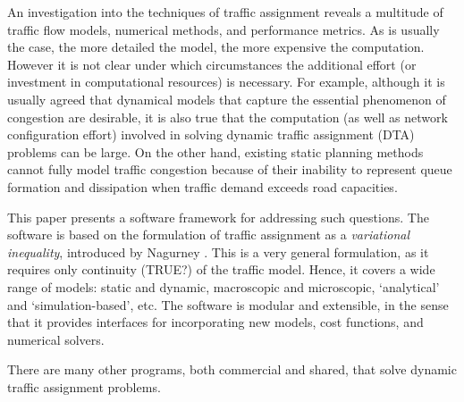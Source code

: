 An investigation into the techniques of traffic assignment reveals a multitude of traffic flow models, numerical methods, and performance metrics.   As is usually the case, the more detailed the model, the more expensive the computation. However it is not clear under which circumstances the additional effort (or investment in computational resources) is necessary. For example, although it is usually agreed that dynamical models that capture the essential phenomenon of congestion are desirable, it is also true that the computation (as well as network configuration effort) involved in solving dynamic traffic assignment (DTA) problems can be large. On the other hand, existing static planning methods cannot fully model traffic congestion because of their inability to represent queue formation and dissipation when traffic demand exceeds road capacities\cite{nie2010solving}. 

This paper presents a software framework for addressing such questions. The software is based on the formulation of traffic assignment as a \textit{variational inequality}, introduced by Nagurney \cite{nagurney2013network}. This is a very general formulation, as it requires only continuity (\XXX TRUE?) of the traffic model. Hence, it covers a wide range of models: static and dynamic, macroscopic and microscopic, `analytical' and `simulation-based', etc. The software is modular and extensible, in the sense that it provides interfaces for incorporating new models, cost functions, and numerical solvers. 

There are many other programs, both commercial and shared, that solve dynamic traffic assignment problems. 




